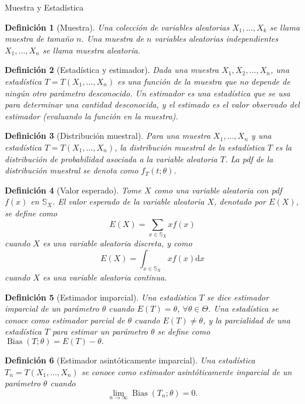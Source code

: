 \documentclass{beamer}
\newtheorem{defi}{Definición}[section]
\begin{document}
	\begin{frame}[allowframebreaks]{Muestra y Estadística}
	\begin{defi}[Muestra]
			Una colección de variables aleatorias $X_1,\dots,X_k$ se llama muestra de tamaño $n$. Una muestra de $n$ variables aleatorias independientes $X_1,\dots,X_n$ se llama muestra aleatoria.
		\end{defi}
		
		\begin{defi}[Estadística y estimador]
			Dada una muestra $X_1,X_2,\dots,X_n$, una estadística $T=T(X_1,\dots,X_n)$ es una función de la muestra que no depende de ningún otro parámetro desconocido. Un estimador es una estadística que se usa para determinar una cantidad desconocida, y el estimado es el valor observado del estimador (evaluando la función en la muestra).
		\end{defi}
		
		\begin{defi}[Distribución muestral]
			Para una muestra $X_1,\dots, X_n$ y una estadística $T=T(X_1,\dots,X_n)$, la distribución muestral de la estadística $T$ es la distribución de probabilidad asociada a la variable aleatoria $T$. La pdf de la distribución muestral se denota como $f_T(t;\theta)$.
		
		\end{defi}
		
		\begin{defi}[Valor esperado]
			Tome $X$ como una variable aleatoria con pdf $f(x)$ en $\mathbb{S}_X$. El valor esperado de la variable aleatoria $X$, denotado por $E(X)$, se define como 
			$$E(X)=\sum_{x\in\mathbb{S}_X} xf(x)$$
			cuando $X$ es una variable aleatoria discreta, y como
			$$E(X)=\int_{x\in\mathbb{S}_X} xf(x)\mathrm{d}x$$
			cuando $X$ es una variable aleatoria continua.
		\end{defi}
		
		\begin{defi}[Estimador imparcial]
		Una estadística $T$ se dice estimador imparcial de un parámetro $\theta$ cuando $E(T)=\theta$, $\forall \theta\in\Theta$. Una estadística se conoce como estimador parcial de $\theta$ cuando $E(T)\neq \theta$, y la parcialidad de una estadística $T$ para estimar un parámetro $\theta$ se define como  $\mathop{Bias}(T;\theta)=E(T)-\theta.$ 
	\end{defi}
	
	\begin{defi}[Estimador asintóticamente imparcial]
		Una estadística $T_n=T(X_1,\dots,X_n)$ se conoce como estimador asintóticamente imparcial de un parámetro $\theta$ cuando $$\lim_{n\rightarrow\infty}\mathop{Bias}(T_n;\theta)=0.$$
	\end{defi}
	

\end{frame}
\end{document}
